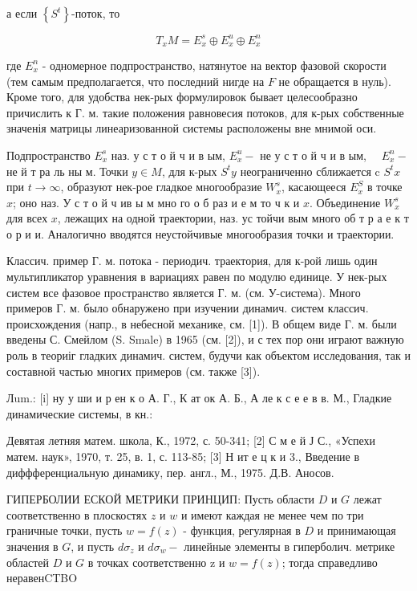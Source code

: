 \documentclass[10pt]{article}
\begin{document}
а если $\left\{S^{t}\right\}$-поток, то



\[

T_{x} M=E_{x}^{s} \oplus E_{x}^{u} \oplus E_{x}^{n}

\]



где $E_{x}^{n}$ - одномерное подпространство, натянутое на вектор фазовой скорости (тем самым предполагается, что последний нигде на $F$ не обращается в нуль). Кроме того, для удобства нек-рых формулировок бывает целесообразно причислить к $Г$. м. такие положения равновесия потоков, для к-рых собственные значенія матрицы линеаризованной системы расположены вне мнимой оси.



Подпространство $E_{x}^{s}$ наз. у с т о й ч и в ым, $E_{x}^{u}-$ не у с т о й ч и в ым, $\quad E_{x}^{n}-$ не й т ра ль ны м. Точки $y \in M$, для к-рых $S^{t} y$ неограниченно сближается c $S^{t} x$ при $t \rightarrow \infty$, образуют нек-рое гладкое многообразие $W_{x}^{s}$, касающееся $E_{x}^{S}$ в точке $x$; оно наз. У с т о й ч ив ы м мно го о б раз и е м то ч к и $x$. Объединение $W_{x}^{s}$ для всех $x$, лежащих на одной траектории, наз. ус тойчи вым много об т р а е к т о р и и. Аналогично вводятся неустойчивые многообразия точки и траектории.



Классич. пример Г. м. потока - периодич. траектория, для к-рой лишь один мультипликатор уравнения в вариациях равен по модулю единице. У нек-рых систем все фазовое пространство является Г. м. (см. У-система). Много примеров Г. м. было обнаружено при изучении динамич. систем классич. происхождения (напр., в небесной механике, см. [1]). В общем виде Г. м. были введены С. Смейлом (S. Smale) в 1965 (см. [2]), и с тех пор они играют важную роль в теориіг гладких динамич. систем, будучи как объектом исследования, так и составной частью многих примеров (см. также [3]).



Лum.: [i] ну у ши и р ен к о А. Г., К ат ок А. Б., А ле к с е е в в. М., Гладкие динамические системы, в кн.:

Девятая летняя матем. школа, К., 1972, с. 50-341; [2] С м е й Ј С., «Успехи матем. наук», 1970, т. 25, в. 1, с. 113-85; [3] Н ит е ц к и 3., Введение в диффференциальную динамику, пер. англ., М., 1975. Д.В. Аносов.



ГИПЕРБОЛИИ ЕСКОЙ МЕТРИКИ ПРИНЦИП: Пусть области $D$ и $G$ лежат соответственно в плоскостях $z$ и $w$ и имеют каждая не менее чем по три граничные точки, пусть $w=f(z)$ - функция, регулярная в $D$ и принимающая значения в $G$, и пусть $d \sigma_{z}$ и $d \sigma_{w}-$ линейные элементы в гиперболич. метрике областей $D$ и $G$ в точках соответственно z и $w=f(z)$; тогда справедливо неравенCTBO
\end{document}
